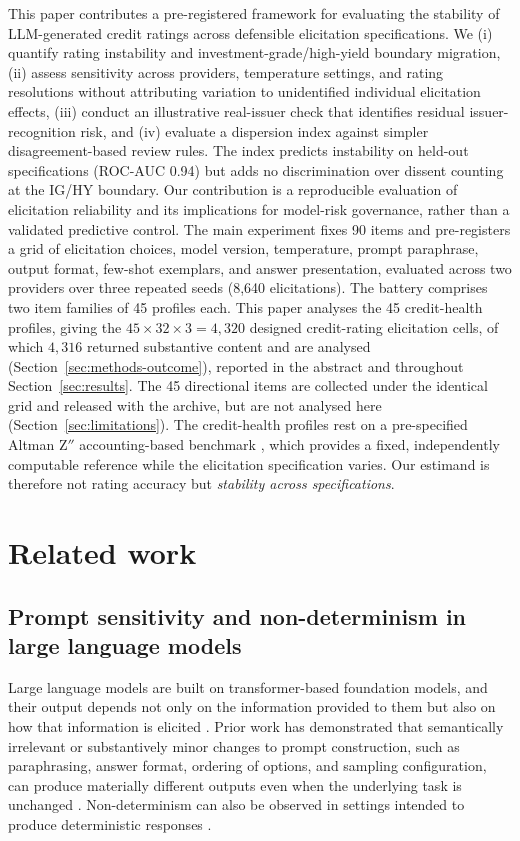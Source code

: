 \documentclass[a4paper,fleqn]{cas-sc}
\begin{document}
This paper contributes a pre-registered framework for evaluating the stability of LLM-generated
credit ratings across defensible elicitation specifications. We (i) quantify rating instability and
investment-grade/high-yield boundary migration, (ii) assess sensitivity across providers,
temperature settings, and rating resolutions without attributing variation to unidentified
individual elicitation effects, (iii) conduct an illustrative real-issuer check that identifies
residual issuer-recognition risk, and (iv) evaluate a dispersion index against simpler
disagreement-based review rules. The index predicts instability on held-out specifications
(ROC-AUC 0.94) but adds no discrimination over dissent counting at the IG/HY boundary. Our
contribution is a reproducible evaluation of elicitation reliability and its implications for
model-risk governance, rather than a validated predictive control.
The main experiment fixes 90 items and pre-registers a grid of elicitation choices, model version,
temperature, prompt paraphrase, output format, few-shot exemplars, and answer presentation, evaluated
across two providers over three repeated seeds (8{,}640 elicitations). The battery comprises two
item families of 45 profiles each. This paper analyses the 45 credit-health profiles, giving the
$45\times32\times3=4{,}320$ designed credit-rating elicitation cells, of which $4{,}316$ returned
substantive content and are analysed (Section~\ref{sec:methods-outcome}), reported in the abstract and throughout
Section~\ref{sec:results}. The 45 directional items are collected under the identical grid and
released with the archive, but are not analysed here (Section~\ref{sec:limitations}). The credit-health profiles rest on a pre-specified Altman Z$''$ accounting-based benchmark \citep{altman2005ems,altmanhotchkiss2006}, which provides a fixed, independently computable reference while the elicitation specification varies. Our estimand is therefore
not rating accuracy but \emph{stability across specifications}.

\section{Related work}
\subsection{Prompt sensitivity and non-determinism in large language models}
Large language models are built on transformer-based foundation models, and their output depends not only
on the information provided to them but also on how that information is elicited
\citep{vaswani2017attention,devlin2019bert,bommasani2021foundation}. Prior work has demonstrated that
semantically irrelevant or substantively minor changes to prompt construction, such as paraphrasing,
answer format, ordering of options, and sampling configuration, can produce materially different outputs
even when the underlying task is unchanged \citep{atil2024nondeterminism,sclar2024formatspread}.
Non-determinism can also be observed in settings intended to produce deterministic responses
\citep{atil2024nondeterminism}.
\end{document}
